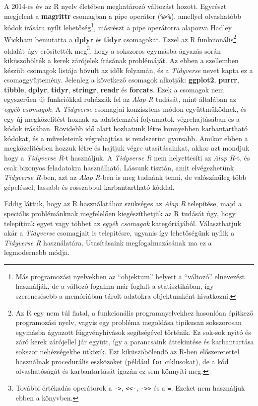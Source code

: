 \documentclass[
]{book}
\begin{document}
A 2014-es év az R nyelv életében meghatározó változást hozott. Egyrészt megjelent a \textbf{magrittr} csomagban a pipe operátor (\texttt{\%\textgreater{}\%}), amellyel olvashatóbb kódok írására nyílt lehetőség\footnote{Más programozási nyelvekben az ``objektum'' helyett a ``változó'' elnevezést használják, de a változó fogalma már foglalt a statisztikában, így szerencsésebb a memóriában tárolt adatokra objektumként hivatkozni.}, másrészt a pipe operátorra alapozva Hadley Wickham bemutatta a \textbf{dplyr} és \textbf{tidyr} csomagokat. Ezzel az R funkcionális\footnote{Az R egy nem túl fiatal, a funkcionális programnyelvekhez hasonlóan építkező programozási nyelv, vagyis egy probléma megoldása tipikusan sokszorosan egymásba ágyazott függvényhívások segítségével történik. Ez sok-sok nyitó és záró kerek zárójellel jár együtt, így a parancsaink áttekintése és karbantartása sokszor nehézségekbe ütközik. Ezt kiküszöbölendő az R-ben előszeretettel használnak procedurális eszközöket (például \texttt{for} ciklusokat), de a kód olvashatóságát és karbantartását igazán ez sem könnyíti meg.} oldalát úgy erősítették meg\footnote{További értékadás operátorok a \texttt{-\textgreater{}}, \texttt{\textless{}\textless{}-}, \texttt{-\textgreater{}\textgreater{}} és a \texttt{=}. Ezeket nem használjuk ebben a könyvben.}, hogy a sokszoros egymásba ágyazás során kiküszöbölték a kerek zárójelek írásának problémáját. Az ebben a szellemben készült csomagok listája bővült az idők folyamán, és a \emph{Tidyverse} nevet kapta ez a csomaggyűjtemény. Jelenleg a következő csomagok alkotják: \textbf{ggplot2}, \textbf{purrr}, \textbf{tibble}, \textbf{dplyr}, \textbf{tidyr}, \textbf{stringr}, \textbf{readr} és \textbf{forcats}. Ezek a csomagok nem egyszerűen új funkciókkal ruházzák fel az \emph{Alap R} tudását, mint általában az \emph{egyéb csomagok}. A \emph{Tidyverse} csomagjai konzisztens módon együttműködnek, és egy új megközelítést hoznak az adatelemzési folyamatok végrehajtásában és a kódok írásában. Rövidebb idő alatt hozhatunk létre könnyebben karbantartható kódokat, és a műveleteink végrehajtása is rendszerint gyorsabb. Amikor ebben a megközelítésben hozzuk létre és hajtjuk végre utasításainkat, akkor azt mondjuk hogy a \emph{Tidyverse R}-t használjuk. A \emph{Tidyverse R} nem helyettesíti az \emph{Alap R}-t, és csak bizonyos feladatokra használható. Lássunk tisztán, amit elvégezhetünk \emph{Tidyverse R}-ben, azt az \emph{Alap R}-ben is meg tudnánk tenni, de valószínűleg több gépeléssel, lassabb és rosszabbul karbantartható kóddal.

Eddig láttuk, hogy az R használatához szükséges az \emph{Alap R} telepítése, majd a speciális problémánknak megfelelően kiegészíthetjük az R tudását úgy, hogy telepítünk egyet vagy többet az \emph{egyéb csomagok} kategóriájából. Választhatjuk akár a \emph{Tidyverse} csomagjait is telepítésre, ugyanis így lehetőségünk nyílik a \emph{Tidyverse R} használatára. Utasításaink megfogalmazásának ma ez a legmodernebb módja.
\end{document}
